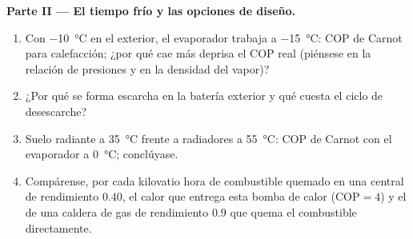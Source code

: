 \begin{problem}
\textbf{Parte II --- El tiempo frío y las opciones de diseño.}
\begin{enumerate}[resume]
  \item Con \qty{-10}{\celsius} en el exterior, el evaporador trabaja a
        \qty{-15}{\celsius}: COP de Carnot para calefacción; ¿por qué cae más deprisa el
        COP real (piénsese en la relación de presiones y en la
        densidad del vapor)?
  \item ¿Por qué se forma escarcha en la batería exterior y qué cuesta el
        ciclo de desescarche?
  \item Suelo radiante a \qty{35}{\celsius} frente a radiadores a
        \qty{55}{\celsius}: COP de Carnot con el evaporador a
        \qty{0}{\celsius}; conclúyase.
  \item Compárense, por cada kilovatio hora de combustible quemado en una central de
        rendimiento $0.40$, el calor que entrega esta bomba de calor ($\mathrm{COP}
        = 4$) y el de una caldera de gas de rendimiento $0.9$ que quema el combustible
        directamente.
\end{enumerate}


\end{problem}
